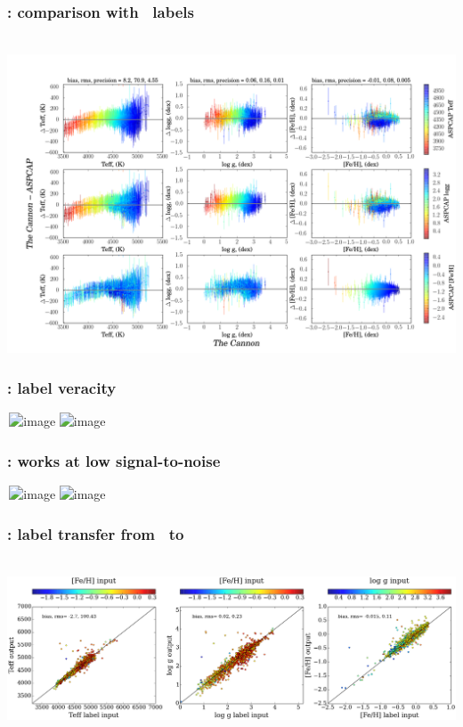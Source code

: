 \documentclass[pdftex]{beamer}
\begin{document}
\begin{frame}
  \frametitle{\tc: comparison with \apogee\ labels}
  \,\hfill\includegraphics[height=\figureheight]{../documents/paper1/plots/cplot2.png} 
\end{frame}

\begin{frame}
  \frametitle{\tc: label veracity}
  \,\hfill\includegraphics<1>[height=\figureheight]{../documents/paper1/plots/iso2_2.png}
         \includegraphics<2>[height=\figureheight]{../documents/paper1/plots/iso2a_2.png}
\end{frame}

\begin{frame}
  \frametitle{\tc: works at low signal-to-noise}
  \,\hfill\includegraphics<1>[height=\figureheight]{../documents/paper1/plots/SNR100to200.png}
         \includegraphics<2>[height=\figureheight]{../documents/paper1/plots/SNR20to30.png}
\end{frame}

\results

\begin{frame}
  \frametitle{\tc: label transfer from \apogee\ to }
  \,\hfill\includegraphics[width=\figurewidth]{LAMOST.png}
\end{frame}
\end{document}
